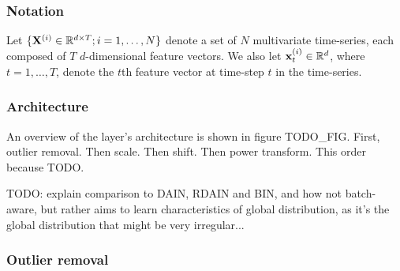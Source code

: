 \documentclass{statsmsc}
\begin{document}
\subsubsection{Notation}%
\label{ssub:Notation}


Let $\{\mathbf{X}^{(i)} \in \mathbb{R}^{d \times T};i=1,\dots,N\}$ denote a set of $N$ multivariate time-series,
each composed of $T$ $d$-dimensional feature vectors. We also let $\mathbf{x}_t^{(i)}\in \mathbb{R}^d$,
where $t=1,\dots,T$, denote the $t$th feature vector at time-step $t$ in the time-series.

\subsubsection{Architecture}%
\label{ssub:Architecture}


An overview of the layer's architecture is shown in figure TODO\_FIG.
First, outlier removal. Then scale. Then shift. Then power transform.
This order because TODO.

TODO: explain comparison to DAIN, RDAIN and BIN, and how not batch-aware, but rather aims to
learn characteristics of global distribution, as it's the global distribution that might be
very irregular...


\subsubsection{Outlier removal}%
\label{ssub:Outlier removal}
\end{document}
